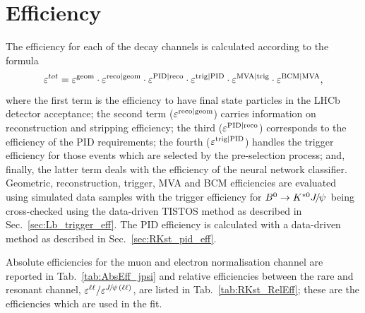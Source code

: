 \section{Efficiency}
\label{sec:RKst_efficiency}

The efficiency for each of the decay channels is calculated according to the formula
%
$$\varepsilon^{tot} = \varepsilon^{\rm geom} \cdot \varepsilon^{\rm reco|geom} \cdot \varepsilon^{\rm PID|reco} \cdot \varepsilon^{\rm trig|PID} \cdot \varepsilon^{\rm MVA|trig}\cdot \varepsilon^{\rm BCM|MVA},$$
%
where the first term is the efficiency to have final state particles in the LHCb detector 
acceptance; the second term ($\varepsilon^{\rm reco|geom}$) carries information on reconstruction and stripping efficiency;
the third ($\varepsilon^{\rm PID|reco}$) corresponds to the efficiency of the PID requirements;
the fourth ($\varepsilon^{\rm trig|PID}$) handles the trigger efficiency for those events which
are selected by the pre-selection process; and, finally, the latter term deals with the efficiency of the neural network classifier.
Geometric, reconstruction, trigger, MVA and BCM efficiencies are evaluated using simulated data samples with the trigger efficiency
for $\Bz\to\Kstarz\jpsi$ being cross-checked using the data-driven TISTOS method as described in Sec.~\ref{sec:Lb_trigger_eff}.
The PID efficiency is calculated with a data-driven method as described in Sec.~\ref{sec:RKst_pid_eff}.

Absolute efficiencies for the muon and electron normalisation channel are reported in Tab.~\ref{tab:AbsEff_jpsi}
and relative efficiencies between the rare and resonant channel, 
$\varepsilon^{\ell\ell}/\varepsilon^{\jpsi(\ell\ell)}$, are listed in Tab.~\ref{tab:RKst_RelEff};
these are the efficiencies which are used in the fit.

%
%
%
%

